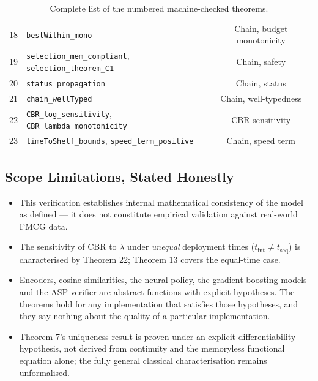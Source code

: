 \documentclass[11pt,a4paper]{article}
\begin{document}
\begin{table}[h]
\begin{tabular}{@{}clc@{}}
			18 & \texttt{bestWithin\_mono} & Chain, budget monotonicity \\
			19 & \texttt{selection\_mem\_compliant}, \texttt{selection\_theorem\_C1} & Chain, safety \\
			20 & \texttt{status\_propagation} & Chain, status \\
			21 & \texttt{chain\_wellTyped} & Chain, well-typedness \\
			22 & \texttt{CBR\_log\_sensitivity}, \texttt{CBR\_lambda\_monotonicity} & CBR sensitivity \\
			23 & \texttt{timeToShelf\_bounds}, \texttt{speed\_term\_positive} & Chain, speed term \\
			\bottomrule
		\end{tabular}
		\caption{Complete list of the numbered machine-checked theorems.}
	\end{table}
	
	\subsection*{Scope Limitations, Stated Honestly}
	
	\begin{itemize}
		\item This verification establishes internal mathematical consistency of the model as defined --- it does not constitute empirical validation against real-world FMCG data.
		\item The sensitivity of CBR to $\lambda$ under \emph{unequal} deployment times ($t_{\text{int}} \neq t_{\text{seq}}$) is characterised by Theorem 22; Theorem 13 covers the equal-time case.
		\item Encoders, cosine similarities, the neural policy, the gradient boosting models and the ASP verifier are abstract functions with explicit hypotheses. The theorems hold for any implementation that satisfies those hypotheses, and they say nothing about the quality of a particular implementation.
		\item Theorem 7's uniqueness result is proven under an explicit differentiability hypothesis, not derived from continuity and the memoryless functional equation alone; the fully general classical characterisation remains unformalised.
	\end{itemize}
	
\end{document}
